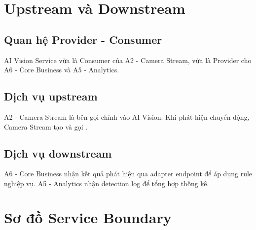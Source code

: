 \section{Upstream và Downstream}

\subsection{Quan hệ Provider - Consumer}

AI Vision Service vừa là Consumer của A2 - Camera Stream, vừa là Provider cho A6 - Core Business và A5 - Analytics.

\subsection{Dịch vụ upstream}

A2 - Camera Stream là bên gọi chính vào AI Vision. Khi phát hiện chuyển động, Camera Stream tạo  và gọi .

\subsection{Dịch vụ downstream}

A6 - Core Business nhận kết quả phát hiện qua adapter endpoint  để áp dụng rule nghiệp vụ. A5 - Analytics nhận detection log để tổng hợp thống kê.

\section{Sơ đồ Service Boundary}

